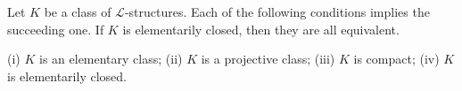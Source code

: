 Let $K$ be a class of $\mathcal{L}$-structures. Each of the following conditions implies the succeeding one. If $K$ is elementarily closed, then they are all equivalent.

(i) $K$ is an elementary class;
(ii) $K$ is a projective class;
(iii) $K$ is compact;
(iv) $K$ is elementarily closed.

